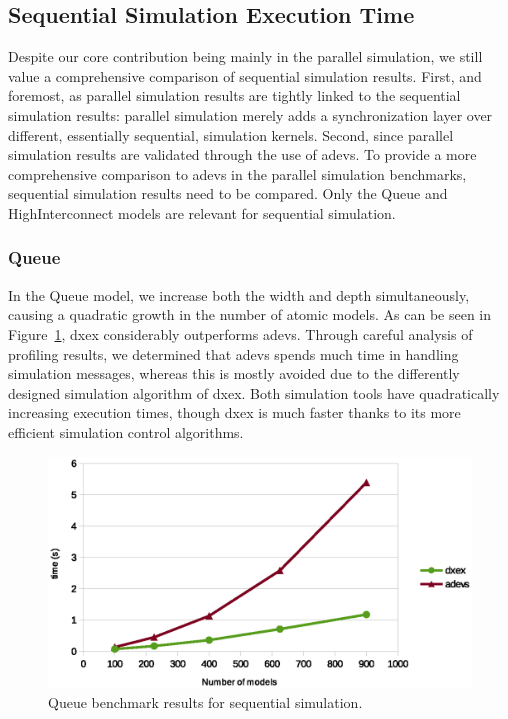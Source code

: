 \subsection{Sequential Simulation Execution Time}
Despite our core contribution being mainly in the parallel simulation, we still value a comprehensive comparison of sequential simulation results.
First, and foremost, as parallel simulation results are tightly linked to the sequential simulation results: parallel simulation merely adds a synchronization layer over different, essentially sequential, simulation kernels.
Second, since parallel simulation results are validated through the use of adevs.
To provide a more comprehensive comparison to adevs in the parallel simulation benchmarks, sequential simulation results need to be compared.
Only the Queue and HighInterconnect models are relevant for sequential simulation.

\subsubsection{Queue}
In the Queue model, we increase both the width and depth simultaneously, causing a quadratic growth in the number of atomic models.
As can be seen in Figure~\ref{fig:Queue_benchmark}, dxex considerably outperforms adevs.
Through careful analysis of profiling results, we determined that adevs spends much time in handling simulation messages, whereas this is mostly avoided due to the differently designed simulation algorithm of dxex.
Both simulation tools have quadratically increasing execution times, though dxex is much faster thanks to its more efficient simulation control algorithms.

\begin{figure}
	\includegraphics[width=\columnwidth]{fig/queue_sequential.eps}
	\caption{Queue benchmark results for sequential simulation.}
	\label{fig:Queue_benchmark}
\end{figure}

